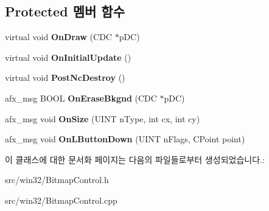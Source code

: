 \subsection*{Protected 멤버 함수}
\begin{DoxyCompactItemize}
\item 
\mbox{\label{class_bitmap_control_a76ead24c70d33421148716a39cf3a17f}} 
virtual void {\bfseries On\+Draw} (C\+DC $\ast$p\+DC)
\item 
\mbox{\label{class_bitmap_control_a532fd9e0bd31674589a224737960bfc0}} 
virtual void {\bfseries On\+Initial\+Update} ()
\item 
\mbox{\label{class_bitmap_control_aed7e031df3fd65a4325ea9bf7da5bdc3}} 
virtual void {\bfseries Post\+Nc\+Destroy} ()
\item 
\mbox{\label{class_bitmap_control_aea73d6e790bb4828eb230c3cd66e5e0b}} 
afx\+\_\+msg B\+O\+OL {\bfseries On\+Erase\+Bkgnd} (C\+DC $\ast$p\+DC)
\item 
\mbox{\label{class_bitmap_control_ac0e60f98809d78a38d5d35942c1bfb2c}} 
afx\+\_\+msg void {\bfseries On\+Size} (U\+I\+NT n\+Type, int cx, int cy)
\item 
\mbox{\label{class_bitmap_control_a2958d0209f702d4207d10797c8aa86bd}} 
afx\+\_\+msg void {\bfseries On\+L\+Button\+Down} (U\+I\+NT n\+Flags, C\+Point point)
\end{DoxyCompactItemize}


이 클래스에 대한 문서화 페이지는 다음의 파일들로부터 생성되었습니다.\+:\begin{DoxyCompactItemize}
\item 
src/win32/Bitmap\+Control.\+h\item 
src/win32/Bitmap\+Control.\+cpp\end{DoxyCompactItemize}
